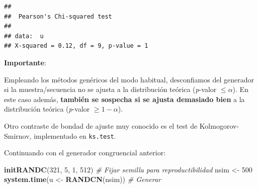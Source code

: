 \documentclass[]{book}
\newenvironment{Shaded}{\begin{snugshade}}{\end{snugshade}}
\newcommand{\KeywordTok}[1]{\textcolor[rgb]{0.13,0.29,0.53}{\textbf{#1}}}
\newcommand{\DecValTok}[1]{\textcolor[rgb]{0.00,0.00,0.81}{#1}}
\newcommand{\StringTok}[1]{\textcolor[rgb]{0.31,0.60,0.02}{#1}}
\newcommand{\CommentTok}[1]{\textcolor[rgb]{0.56,0.35,0.01}{\textit{#1}}}
\newcommand{\NormalTok}[1]{#1}
\theoremstyle{definition}
\theoremstyle{definition}
\theoremstyle{definition}
\theoremstyle{remark}
\let\BeginKnitrBlock\begin \let\EndKnitrBlock\end
\begin{document}
\begin{verbatim}
## 
##  Pearson's Chi-squared test
## 
## data:  u
## X-squared = 0.12, df = 9, p-value = 1
\end{verbatim}

\textbf{Importante}:

Empleando los métodos genéricos del modo habitual, desconfiamos del
generador si la muestra/secuencia no se ajusta a la distribución teórica
(\emph{p}-valor \(\leq \alpha\)). En este caso además, \textbf{también
se sospecha si se ajusta demasiado bien} a la distribución teórica
(\emph{p}-valor \(\geq1-\alpha\)).

Otro contraste de bondad de ajuste muy conocido es el test de
Kolmogorov-Smirnov, implementado en \texttt{ks.test}.

\BeginKnitrBlock{exercise}
\protect\hypertarget{exr:unnamed-chunk-12}{}{\label{exr:unnamed-chunk-12} }
\EndKnitrBlock{exercise}

Continuando con el generador congruencial anterior:

\begin{Shaded}
\begin{Highlighting}[]
\KeywordTok{initRANDC}\NormalTok{(}\DecValTok{321}\NormalTok{, }\DecValTok{5}\NormalTok{, }\DecValTok{1}\NormalTok{, }\DecValTok{512}\NormalTok{)       }\CommentTok{# Fijar semilla para reproductibilidad}
\NormalTok{nsim <-}\StringTok{ }\DecValTok{500}
\KeywordTok{system.time}\NormalTok{(u <-}\StringTok{ }\KeywordTok{RANDCN}\NormalTok{(nsim))  }\CommentTok{# Generar}
\end{Highlighting}
\end{Shaded}
\end{document}
